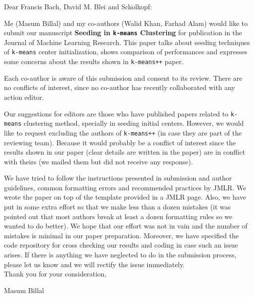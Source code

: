 \documentclass[twoside,11pt]{article} %
\begin{document}
	\noindent Dear Francis Bach, David M. Blei and Sch$\ddot{\mbox{o}}$lkopf: \\
	\medskip
	
	Me (Masum Billal) and my co-authors (Walid Khan, Farhad Alam) would like to submit our manuscript \textbf{Seeding in \texttt{k-means} Clustering} for publication in the Journal of Machine Learning Research. This paper talks about seeding techniques of \texttt{k-means} center initialization, shows comparison of performances and expresses some concerns about the results shown in \texttt{k-means++} paper.\\
	\medskip
	
	Each co-author is aware of this submission and consent to its review.  There are no conflicts of interest, since no co-author has recently collaborated with any action editor.
	\\
	\medskip
	
	Our suggestions for editors are those who have published papers related to \texttt{k-means} clustering method, specially in seeding initial centers. However, we would like to request excluding the authors of \texttt{k-means++} (in case they are part of the reviewing team). Because it would probably be a conflict of interest since the results shown in our paper (clear details are written in the paper) are in conflict with theirs (we mailed them but did not receive any response).\\
	\medskip
	
	We have tried to follow the instructions presented in submission and author guidelines, common formatting errors and recommended practices by JMLR. We wrote the paper on top of the template provided in a JMLR page. Also, we have put in some extra effort so that we make less than a dozen mistakes (it was pointed out that most authors break at least a dozen formatting rules so we wanted to do better). We hope that our effort was not in vain and the number of mistakes is minimal in our paper preparation. Moreover, we have specified the code repository for cross checking our results and coding in case such an issue arises. If there is anything we have neglected to do in the submission process, please let us know and we will rectify the issue immediately. \\
	
	\medskip
	\noindent Thank you for your consideration, \\
	\medskip
	
	\noindent Masum Billal
\end{document}
